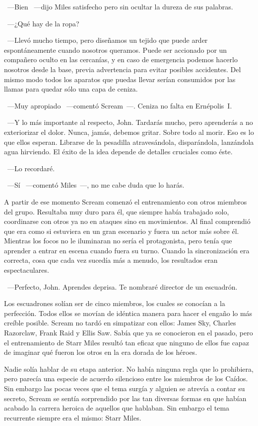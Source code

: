 ~---Bien ~---dijo Miles satisfecho pero sin ocultar la dureza de sus palabras.

~---¿Qué hay de la ropa?

~---Llevó mucho tiempo, pero diseñamos un tejido que puede arder espontáneamente cuando nosotros queramos. Puede ser accionado por un compañero oculto en las cercanías, y en caso de emergencia podemos hacerlo nosotros desde la base, previa advertencia para evitar posibles accidentes. Del mismo modo todos los aparatos que puedas llevar serían consumidos por las llamas para quedar sólo una capa de ceniza.

~---Muy apropiado ~---comentó Scream~---. Ceniza no falta en Ernépolis~I.

~---Y lo más importante al respecto, John. Tardarás mucho, pero aprenderás a no exteriorizar el dolor. Nunca, jamás, debemos gritar. Sobre todo al morir. Eso es lo que ellos esperan. Librarse de la pesadilla atravesándola, disparándola, lanzándola agua hirviendo. El éxito de la idea depende de detalles cruciales como éste.

~---Lo recordaré.

~---Sí ~---comentó Miles~---, no me cabe duda que lo harás.

A partir de ese momento Scream comenzó el entrenamiento con otros miembros del grupo. Resultaba muy duro para él, que siempre había trabajado solo, coordinarse con otros ya no en ataques sino en movimientos. Al final comprendió que era como si estuviera en un gran escenario y fuera un actor más sobre él. Mientras los focos no le iluminaran no sería el protagonista, pero tenía que aprender a entrar en escena cuando fuera su turno. Cuando la sincronización era correcta, cosa que cada vez sucedía más a menudo, los resultados eran espectaculares.

~---Perfecto, John. Aprendes deprisa. Te nombraré director de un escuadrón.

Los escuadrones solían ser de cinco miembros, los cuales se conocían a la perfección. Todos ellos se movían de idéntica manera para hacer el engaño lo más creíble posible. Scream no tardó en simpatizar con ellos: James Sky, Charles Razorclaw, Frank Raid y Ellis Saw. Sabía que ya se conocieron en el pasado, pero el entrenamiento de Starr Miles resultó tan eficaz que ninguno de ellos fue capaz de imaginar qué fueron los otros en la era dorada de los héroes.

Nadie solía hablar de su etapa anterior. No había ninguna regla que lo prohibiera, pero parecía una especie de acuerdo silencioso entre los miembros de los Caídos. Sin embargo las pocas veces que el tema surgía y alguien se atrevía a contar su secreto, Scream se sentía sorprendido por las tan diversas formas en que habían acabado la carrera heroica de aquellos que hablaban. Sin embargo el tema recurrente siempre era el mismo: Starr Miles.

